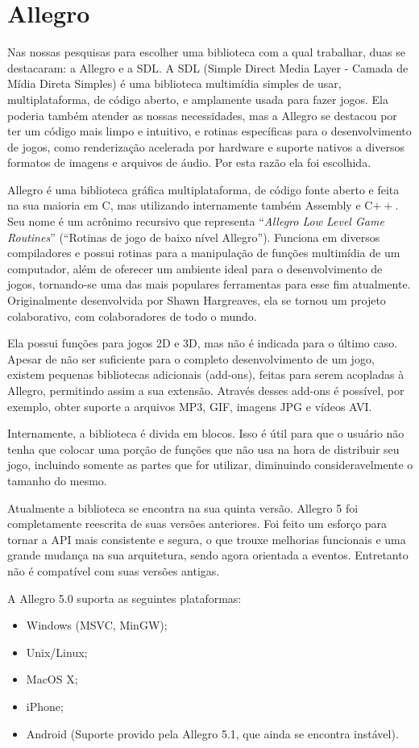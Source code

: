 \section{Allegro}
\label{allegro}
%
Nas nossas pesquisas para escolher uma biblioteca com a qual trabalhar, duas se destacaram: a Allegro e a SDL. A SDL (Simple Direct Media Layer - 
Camada de Mídia Direta Simples) é uma biblioteca multimídia simples de usar, multiplataforma, de código aberto, e amplamente usada para fazer  jogos. 
Ela poderia também atender as nossas necessidades, mas a Allegro se destacou por ter um código mais limpo e intuitivo, e rotinas específicas 
para o desenvolvimento de jogos, como renderização acelerada por hardware e suporte nativos a diversos formatos de imagens e arquivos de áudio.
Por esta razão ela foi escolhida.
\par 
Allegro\cite{AllegroDoc} é uma biblioteca gráfica multiplataforma, de código fonte aberto e feita na sua maioria em C, mas utilizando internamente também Assembly e C$++$. 
Seu nome é um acrônimo recursivo que representa ``\textit{Allegro Low Level Game Routines}'' (``Rotinas de jogo de baixo nível Allegro'').
Funciona em diversos compiladores e possui rotinas para a manipulação de funções multimídia de um computador, além de oferecer um ambiente ideal 
para o desenvolvimento de jogos, tornando-se uma das mais populares ferramentas para esse fim atualmente. Originalmente desenvolvida por 
Shawn Hargreaves, ela se tornou um projeto colaborativo, com colaboradores de todo o mundo.
\par
Ela possui funções para jogos 2D e 3D, mas não é indicada para o último caso. Apesar de não ser suficiente para o completo desenvolvimento 
de um jogo, existem pequenas bibliotecas adicionais (add-ons), feitas para serem acopladas à Allegro, permitindo assim a sua extensão. Através 
desses add-ons é possível, por exemplo, obter suporte a arquivos MP3, GIF, imagens JPG e vídeos AVI.
\par
Internamente, a biblioteca é divida em blocos. Isso é útil para que o usuário não tenha que colocar uma porção de funções que não usa na hora 
de distribuir seu jogo, incluindo somente as partes que for utilizar, diminuindo consideravelmente o tamanho do mesmo.
\par
Atualmente a biblioteca se encontra na sua quinta versão. Allegro 5 foi completamente reescrita de suas versões anteriores. Foi feito um esforço 
para tornar a API mais consistente e segura, o que trouxe melhorias funcionais e uma grande mudança na sua arquitetura, sendo agora orientada 
a eventos. Entretanto não é compatível com suas versões antigas.
\par
A Allegro 5.0 suporta as seguintes plataformas:
\begin{itemize}
 \item Windows (MSVC, MinGW);
 \item Unix/Linux;
 \item MacOS X;
 \item iPhone;
 \item Android (Suporte provido pela Allegro 5.1, que ainda se encontra instável).
\end{itemize}
%
%
